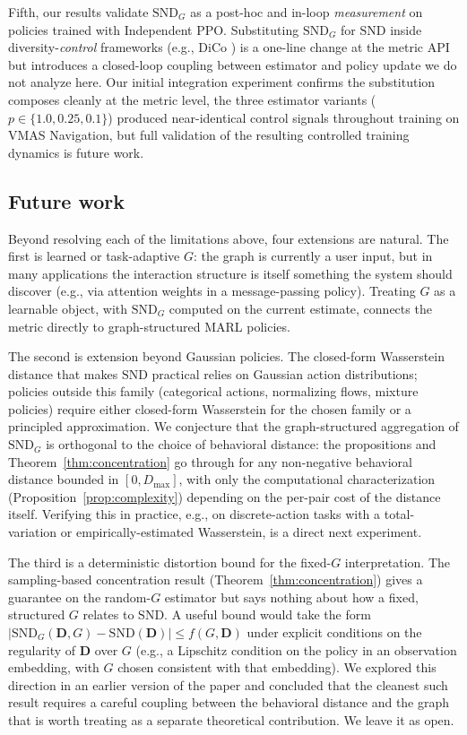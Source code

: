 \documentclass[11pt]{article}
\theoremstyle{plain}
\theoremstyle{definition}
\theoremstyle{remark}
\newcommand{\SND}{\ensuremath{\mathrm{SND}}}
\newcommand{\SNDG}{\mathrm{SND}_{G}}
\begin{document}
Fifth, our results validate $\SNDG$ as a post-hoc and in-loop
\emph{measurement} on policies trained with Independent PPO.
Substituting $\SNDG$ for $\SND$ inside diversity-\emph{control}
frameworks (e.g., DiCo \citep{bettini2024dico}) is a one-line change
at the metric API but introduces a closed-loop coupling between
estimator and policy update we do not analyze here. Our initial
integration experiment confirms the substitution composes cleanly at
the metric level, the three estimator variants ($p \in \{1.0, 0.25,
0.1\}$) produced near-identical control signals throughout training
on VMAS Navigation, but full validation of the resulting controlled
training dynamics is future work.

\subsection*{Future work}

Beyond resolving each of the limitations above, four extensions are
natural. The first is learned or task-adaptive $G$: the graph is
currently a user input, but in many applications the interaction
structure is itself something the system should discover (e.g., via
attention weights in a message-passing policy). Treating $G$ as a
learnable object, with $\SNDG$ computed on the current estimate, connects the metric directly to graph-structured MARL policies.

The second is extension beyond Gaussian policies. The closed-form
Wasserstein distance that makes $\SND$ practical relies on Gaussian
action distributions; policies outside this family (categorical
actions, normalizing flows, mixture policies) require either
closed-form Wasserstein for the chosen family or a principled
approximation. We conjecture that the graph-structured aggregation of
$\SNDG$ is orthogonal to the choice of behavioral distance: the
propositions and Theorem~\ref{thm:concentration} go through for any
non-negative behavioral distance bounded in $[0, D_{\max}]$, with
only the computational characterization
(Proposition~\ref{prop:complexity}) depending on the per-pair cost of
the distance itself. Verifying this in practice, e.g., on discrete-action tasks with a total-variation or empirically-estimated Wasserstein, is a direct next experiment.

The third is a deterministic distortion bound for the fixed-$G$
interpretation. The sampling-based concentration result
(Theorem~\ref{thm:concentration}) gives a guarantee on the
random-$G$ estimator but says nothing about how a fixed, structured
$G$ relates to $\SND$. A useful bound would take the form
$|\SNDG(\mathbf{D}, G) - \SND(\mathbf{D})| \leq f(G, \mathbf{D})$
under explicit conditions on the regularity of $\mathbf{D}$ over $G$
(e.g., a Lipschitz condition on the policy in an observation
embedding, with $G$ chosen consistent with that embedding). We
explored this direction in an earlier version of the paper and
concluded that the cleanest such result requires a careful coupling
between the behavioral distance and the graph that is worth treating
as a separate theoretical contribution. We leave it as open.
\end{document}
